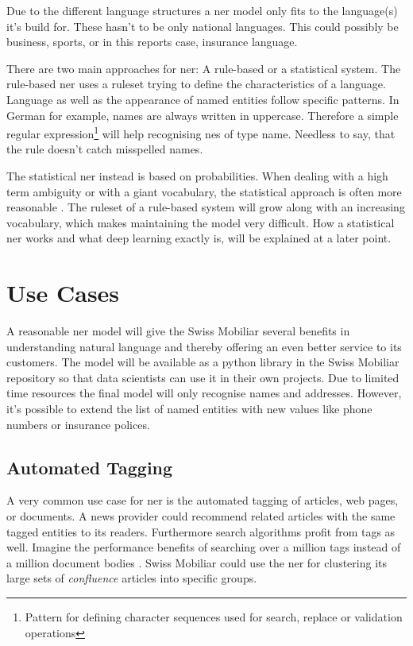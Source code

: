 Due to the different language structures a \acrshort{ner} model only fits to the language(s) it's build for. These hasn't to be only national languages. This could possibly be business, sports, or in this reports case, insurance language.

There are two main approaches for \acrlong{ner}: A rule-based or a statistical system. The rule-based \acrshort{ner} uses a ruleset trying to define the characteristics of a language. Language as well as the appearance of named entities follow specific patterns. In German for example, names are always written in uppercase. Therefore a simple regular expression\footnote{Pattern for defining character sequences used for search, replace or validation operations} will help recognising \acrshort{ne}s of type name. Needless to say, that the rule doesn't catch misspelled names.

The statistical \acrshort{ner} instead is based on probabilities. When dealing with a high term ambiguity or with a giant vocabulary, the statistical approach is often more reasonable \cite{blub}. The ruleset of a rule-based system will grow along with an increasing vocabulary, which makes maintaining the model very difficult. How a statistical \acrlong{ner} works and what deep learning exactly is, will be explained at a later point.

\section{Use Cases}

A reasonable \acrshort{ner} model will give the Swiss Mobiliar several benefits in understanding natural language and thereby offering an even better service to its customers. The model will be available as a python library in the Swiss Mobiliar repository so that data scientists can use it in their own projects. Due to limited time resources the final model will only recognise names and addresses. However, it's possible to extend the list of named entities with new values like phone numbers or insurance polices.

\subsection{Automated Tagging}

A very common use case for \acrlong{ner} is the automated tagging of articles, web pages, or documents. A news provider could recommend related articles with the same tagged entities to its readers. Furthermore search algorithms profit from tags as well. Imagine the performance benefits of searching over a million tags instead of a million document bodies \cite{gupta}. Swiss Mobiliar could use the \acrshort{ner} for clustering its large sets of \emph{confluence} articles into specific groups.

